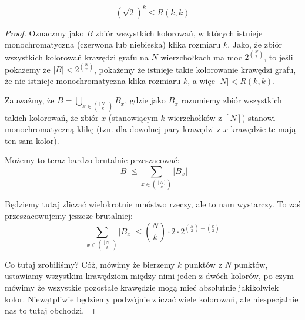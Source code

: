 \begin{theorem}
      \begin{equation}
          (\sqrt{2})^{k} \leq R(k,k)
      \end{equation}
    \end{theorem}

      \begin{proof}
          Oznaczmy jako $B$ zbiór wszystkich kolorowań, w których istnieje monochromatyczna (czerwona lub niebieska) klika rozmiaru $k$. Jako, że zbiór wszystkich kolorowań krawędzi grafu na $N$ wierzchołkach ma moc $2^{\binom{N}{2}}$, to jeśli pokażemy że $|B| < 2^{\binom{N}{2}}$, pokażemy że istnieje takie kolorowanie krawędzi grafu, że nie istnieje monochromatyczna klika rozmiaru $k$, a więc $|N| < R(k,k)$.

          Zauważmy, że $ B = \bigcup_{x \in \binom{[N]}{k}} B_x $, gdzie jako $B_x$ rozumiemy zbiór wszystkich takich kolorowań, że zbiór $x$ (stanowiącym $k$ wierzchołków z $[N]$) stanowi monochromatyczną klikę (tzn. dla dowolnej pary krawędzi z $x$ krawędzie te mają ten sam kolor).

          Możemy to teraz bardzo brutalnie przeszacować:
          \begin{equation*}
              |B| \leq \sum_{x \in \binom{[N]}{k}} |B_x|
          \end{equation*}

          Będziemy tutaj zliczać wielokrotnie mnóstwo rzeczy, ale to nam wystarczy. To zaś przeszacowujemy jeszcze brutalniej:
          \begin{equation*}
              \sum_{x \in \binom{[N]}{k}} |B_x| \leq \binom{N}{k} \cdot 2 \cdot 2^{\binom{N}{2} - \binom{k}{2}} 
          \end{equation*}

          Co tutaj zrobiliśmy? Cóż, mówimy że bierzemy $k$ punktów z $N$ punktów, ustawiamy wszystkim krawędziom między nimi jeden z dwóch kolorów, po czym mówimy że wszystkie pozostałe krawędzie mogą mieć absolutnie jakikolwiek kolor. Niewątpliwie będziemy podwójnie zliczać wiele kolorowań, ale niespecjalnie nas to tutaj obchodzi. 


\end{proof}
